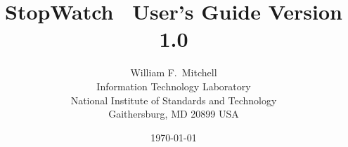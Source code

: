 \batchmode
{}
\makeatletter

\title{\bf StopWatch \ User's Guide Version 1.0}

\author{William F.~Mitchell\\ 
        Information Technology Laboratory \\ 
        National Institute of Standards and Technology \\ 
        Gaithersburg, MD 20899 USA}

\date{\today}
%

\pagestyle{plain}

\setlength{\textheight}{9.0in}
\setlength{\textwidth}{6.0in}

\setlength{\oddsidemargin}{-0.25in}
\setlength{\topmargin}{-0.75in}

\setlength{\parindent}{1.5em}
\setlength{\parskip}{0ex}








\html{}

































%


\newcommand {\dir}[1]{{\tt #1}}

\newcommand {\file}[1]{{\it #1}}

\newcommand {\var}[1]{{\it #1}}

\newcommand {\routine}[1]{{\bf #1}}

\newcommand {\type}[1]{{\tt #1}}

\newcommand {\stopwatch}{{\sc StopWatch}}

\renewcommand {\stopwatch}{StopWatch}

\newcommand {\stopwatchmod}{{\tt stopwatch}}

\newcommand {\create}{\routine{create\_watch}}

\newcommand {\destroygroup}{\routine{destroy\_watchgroup}}

